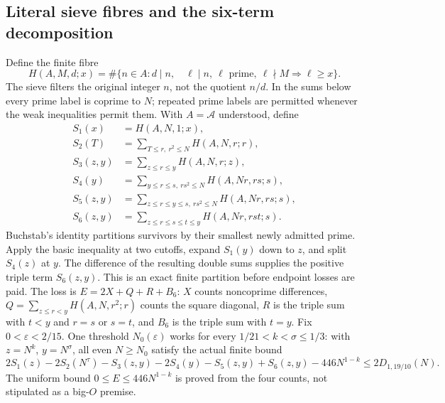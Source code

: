 \subsection{Literal sieve fibres and the six-term decomposition}
\label{sec:liliu-fibres}
Define the finite fibre
\[
 H(A,M,d;x)=\#\{n\in A:d\mid n,\quad
 \ell\mid n,\ \ell\text{ prime},\ \ell\nmid M\Longrightarrow\ell\ge x\}.
\]
The sieve filters the original integer $n$, not the quotient $n/d$.
In the sums below every prime label is coprime to $N$; repeated prime
labels are permitted whenever the weak inequalities permit them.
With $A=\mathcal A$ understood, define
\begin{align*}
 S_1(x)&=H(A,N,1;x),\\
 S_2(T)&=\sum_{T\le r,\ r^2\le N}H(A,N,r;r),\\
 S_3(z,y)&=\sum_{z\le r\le y}H(A,N,r;z),\\
 S_4(y)&=\sum_{y\le r\le s,\ rs^2\le N}H(A,Nr,rs;s),\\
 S_5(z,y)&=\sum_{z\le r\le y\le s,\ rs^2\le N}H(A,Nr,rs;s),\\
 S_6(z,y)&=\sum_{z\le r\le s\le t\le y}H(A,Nr,rst;s).
\end{align*}
Buchstab's identity partitions survivors by their smallest newly admitted
prime.  Apply the basic inequality at two cutoffs, expand $S_1(y)$ down
to $z$, and split $S_4(z)$ at $y$.  The difference of the resulting double
sums supplies the positive triple term $S_6(z,y)$.
This is an exact finite partition before endpoint losses are paid.
The loss is $E=2X+Q+R+B_6$: $X$ counts noncoprime differences,
$Q=\sum_{z\le r<y}H(A,N,r^2;r)$ counts the square diagonal,
$R$ is the triple sum with $t<y$ and $r=s$ or $s=t$,
and $B_6$ is the triple sum with $t=y$.
Fix $0<\varepsilon<2/15$.  One threshold $N_0(\varepsilon)$ works
for every $1/21<k<\sigma\le1/3$: with $z=N^k$, $y=N^\sigma$,
all even $N\ge N_0$ satisfy the actual finite bound
\[
 2S_1(z)-2S_2(N^\tau)-S_3(z,y)-2S_4(y)-S_5(z,y)+S_6(z,y)
 -446N^{1-k}\le2D_{1,19/10}(N).
\]
The uniform bound $0\le E\le446N^{1-k}$ is proved from the four counts,
not stipulated as a big-$O$ premise.

